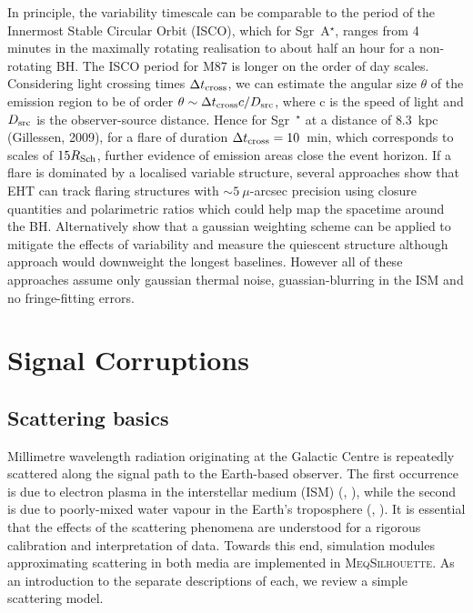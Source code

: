 In principle, the variability timescale can be comparable to the period of the Innermost Stable Circular Orbit (ISCO), which for Sgr~A$^\star$, ranges from 4 minutes in the maximally rotating realisation to about half an hour for a non-rotating BH. The ISCO period for M87 is longer on the order of day scales. Considering light crossing times $\Delta t_{\rm cross}$, we can estimate the angular size $\theta$ of the emission region to be of order $\theta \sim \Delta t_{\rm cross} c /D_{\rm src}$, where c is the speed of light and $D_{\rm src}$ is the observer-source distance. Hence for Sgr~$^\star$ at a distance of $8.3$~kpc (Gillessen, 2009), for a flare of duration $ \Delta t_{\rm cross} =10$~min, which corresponds to scales of  $15 R_{\rm Sch}$, further evidence of emission areas close the event horizon.
If a flare is dominated by a localised variable structure, several approaches \citep{Doeleman_2009, Fish_2009b, Johnson_2014} show that EHT can track flaring structures with $\sim 5\ \mu$-arcsec precision using closure quantities and polarimetric ratios which could help map the spacetime around the BH. Alternatively \citet{Lu_2016} show that a gaussian weighting scheme can be applied to mitigate the effects of variability and measure the quiescent structure although approach would downweight the longest baselines. However all of these approaches assume only gaussian thermal noise, guassian-blurring in the ISM and no fringe-fitting errors.

\section{Signal Corruptions}

\subsection{Scattering basics}\label{sec:basic_scat}

Millimetre wavelength radiation originating at the Galactic Centre is repeatedly scattered along the signal path to the Earth-based observer. The first occurrence is due to electron plasma in the interstellar medium (ISM) (\citealt{Bower_2006}, \citealt{Gwinn_2014}), while the second is due to poorly-mixed water vapour in the Earth's troposphere (\citealt*{Carilli_1999}, \citealt*{Lay_1997}). It is essential that the effects of the scattering phenomena are understood for a rigorous calibration and interpretation of data.  Towards this end, simulation modules approximating scattering in both media are implemented in \textsc{MeqSilhouette}. As an introduction to the separate descriptions of each, we review a simple scattering model.

